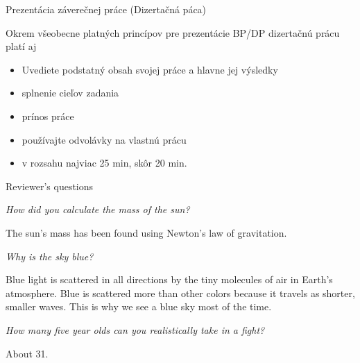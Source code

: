 \documentclass{beamer}
\begin{document}
\begin{frame}{Prezentácia záverečnej práce (Dizertačná páca)}

Okrem všeobecne platných princípov pre prezentácie BP/DP dizertačnú prácu platí aj

\begin{itemize}
 \item Uvediete podstatný obsah svojej práce a hlavne jej výsledky
 \item splnenie cieľov zadania
 \item prínos práce
 \item používajte odvolávky na vlastnú prácu
 \item v rozsahu najviac 25 min, skôr 20 min.
\end{itemize}
\end{frame}




\reviewbegin                                 %
\begin{frame}{Reviewer's questions}

{\it How did you calculate the mass of the sun?}

The sun's mass has been found using Newton's law of gravitation.

\framebreak

{\it Why is the sky blue?}

Blue light is scattered in all directions by the tiny molecules of air in Earth's atmosphere. Blue is scattered more than other colors because it travels as shorter, smaller waves. This is why we see a blue sky most of the time.

\framebreak

{\it How many five year olds can you realistically take in a fight?}

About 31.

\end{frame}
\reviewend                                  %

\end{document}
